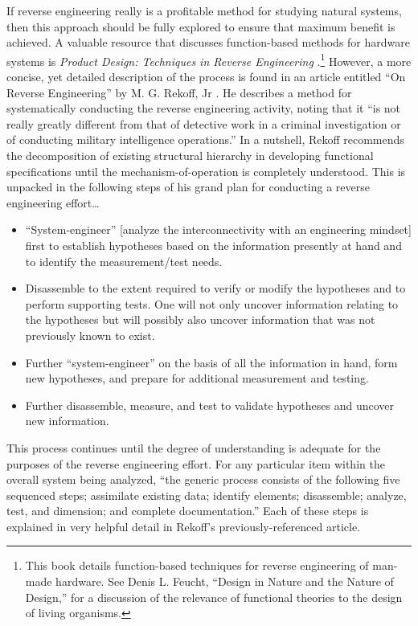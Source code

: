 If reverse engineering really is a profitable method for studying
natural systems, then this approach should be fully explored to ensure
that maximum benefit is achieved. A valuable resource that discusses
function-based methods for hardware systems is \textit{Product Design:
Techniques in Reverse Engineering} \citep{ottowood2001}.\footnote{%
This book details function-based
techniques for reverse engineering of man-made hardware. See Denis L.
Feucht, ``Design in Nature and the Nature of Design,''\citep{feucht1999} 
for a discussion of the relevance of
functional theories to the design of living organisms.
} However, a more
concise, yet detailed description of the process is found in an article
entitled ``On Reverse Engineering'' by M. G. Rekoff,
Jr \citep{rekoff1985}. He describes a method for systematically
conducting the reverse engineering activity, noting that it ``is not
really greatly different from that of detective work in a criminal
investigation or of conducting military intelligence
operations.''\citep[][p.~245]{rekoff1985} In a nutshell, Rekoff recommends the
decomposition of existing structural hierarchy in developing functional
specifications until the mechanism-of-operation is completely
understood. This is unpacked in the following steps of his grand plan
for conducting a reverse engineering effort{\ldots}

\begin{itemize}
\item 
``System-engineer'' [analyze the interconnectivity with an engineering
mindset] first to establish hypotheses based on the information
presently at hand and to identify the measurement/test needs.
\item 
Disassemble to the extent required to verify or modify the hypotheses
and to perform supporting tests. One will not only uncover information
relating to the hypotheses but will possibly also uncover information
that was not previously known to exist.
\item 
Further ``system-engineer'' on the basis of all the information in hand,
form new hypotheses, and prepare for additional measurement and
testing.
\item 
Further disassemble, measure, and test to validate hypotheses and
uncover new information.
\end{itemize}

This process continues until the degree of understanding is adequate for
the purposes of the reverse engineering effort. For any particular item
within the overall system being analyzed, “the generic process consists
of the following five sequenced steps; assimilate existing data;
identify elements; disassemble; analyze, test, and dimension; and
complete documentation.” Each of these steps is explained in very
helpful detail in Rekoff’s previously-referenced article.

